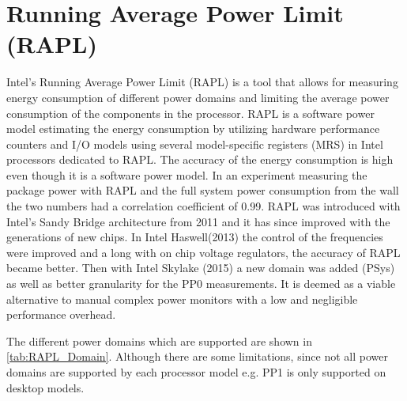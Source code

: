 \section{Running Average Power Limit (RAPL)}
Intel's Running Average Power Limit (RAPL) is a tool that allows for measuring energy consumption of different power domains and limiting the average power consumption of the components in the processor. RAPL is a software power model estimating the energy consumption by utilizing hardware performance counters and I/O models using several model-specific registers (MRS) in Intel processors dedicated to RAPL.\cite{Power-Management_Sandy_Bridge,Zhang2021} The accuracy of the energy consumption is high even though it is a software power model\cite{RAPL_ACU1,RAPL_ACU2}. In an experiment measuring the package power with RAPL and the full system power consumption from the wall the two numbers had a correlation coefficient of 0.99.\cite{RAPL_in_action} RAPL was introduced with Intel's Sandy Bridge architecture from 2011 and it has since improved with the generations of new chips. In Intel Haswell(2013) the control of the frequencies were improved and a long with on chip voltage regulators, the accuracy of RAPL became better. Then with Intel Skylake (2015) a new domain was added (PSys) as well as better granularity for the PP0 measurements. It is deemed as a viable alternative to manual complex power monitors with a low and negligible performance overhead. \cite{RAPL_in_action}

The different power domains which are supported are shown in \cref{tab:RAPL_Domain}. Although there are some limitations, since not all power domains are supported by each processor model e.g. PP1 is only supported on desktop models.

